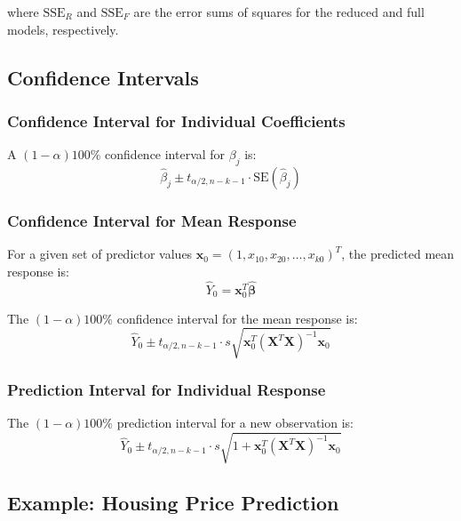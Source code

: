 \documentclass[twoside]{book}
\begin{document}
where $\text{SSE}_R$ and $\text{SSE}_F$ are the error sums of squares for the reduced and full models, respectively.

\subsection{Confidence Intervals}

\subsubsection{Confidence Interval for Individual Coefficients}

A $(1-\alpha)100\%$ confidence interval for $\beta_j$ is:
\begin{equation}
\hat{\beta}_j \pm t_{\alpha/2, n-k-1} \cdot \text{SE}(\hat{\beta}_j)
\end{equation}

\subsubsection{Confidence Interval for Mean Response}

For a given set of predictor values $\mathbf{x}_0 = (1, x_{10}, x_{20}, \ldots, x_{k0})^T$, the predicted mean response is:
\begin{equation}
\hat{Y}_0 = \mathbf{x}_0^T\hat{\boldsymbol{\beta}}
\end{equation}

The $(1-\alpha)100\%$ confidence interval for the mean response is:
\begin{equation}
\hat{Y}_0 \pm t_{\alpha/2, n-k-1} \cdot s\sqrt{\mathbf{x}_0^T(\mathbf{X}^T\mathbf{X})^{-1}\mathbf{x}_0}
\end{equation}

\subsubsection{Prediction Interval for Individual Response}

The $(1-\alpha)100\%$ prediction interval for a new observation is:
\begin{equation}
\hat{Y}_0 \pm t_{\alpha/2, n-k-1} \cdot s\sqrt{1 + \mathbf{x}_0^T(\mathbf{X}^T\mathbf{X})^{-1}\mathbf{x}_0}
\end{equation}

\subsection{Example: Housing Price Prediction}
\end{document}

